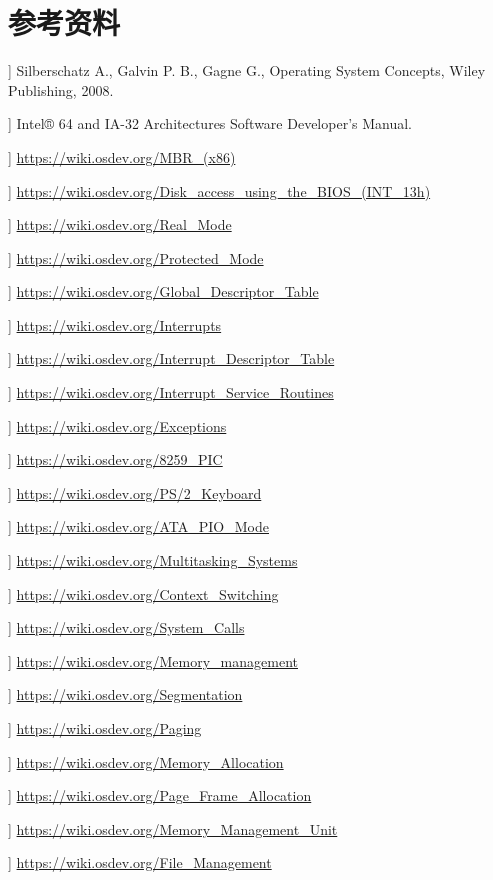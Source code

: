 \section*{参考资料}

\begin{list}{}{\setlength{\labelwidth}{0.5cm} \setlength{\labelsep}{0cm}}
    \item[\hfill[1]] Silberschatz A., Galvin P. B., Gagne G., Operating System Concepts, Wiley Publishing, 2008.
    \item[\hfill[2]] Intel® 64 and IA-32 Architectures Software Developer's Manual.
    \item[\hfill[3]] \url{https://wiki.osdev.org/MBR\_(x86)}
    \item[\hfill[4]] \url{https://wiki.osdev.org/Disk\_access\_using\_the\_BIOS\_(INT\_13h)}
    \item[\hfill[5]] \url{https://wiki.osdev.org/Real\_Mode}
    \item[\hfill[6]] \url{https://wiki.osdev.org/Protected\_Mode}
    \item[\hfill[7]] \url{https://wiki.osdev.org/Global\_Descriptor\_Table}
    \item[\hfill[8]] \url{https://wiki.osdev.org/Interrupts}
    \item[\hfill[9]] \url{https://wiki.osdev.org/Interrupt\_Descriptor\_Table}
    \item[\hfill[10]] \url{https://wiki.osdev.org/Interrupt\_Service\_Routines}
    \item[\hfill[11]] \url{https://wiki.osdev.org/Exceptions}
    \item[\hfill[12]] \url{https://wiki.osdev.org/8259\_PIC}
    \item[\hfill[13]] \url{https://wiki.osdev.org/PS/2\_Keyboard}
    \item[\hfill[14]] \url{https://wiki.osdev.org/ATA\_PIO\_Mode}
    \item[\hfill[15]] \url{https://wiki.osdev.org/Multitasking\_Systems}
    \item[\hfill[16]] \url{https://wiki.osdev.org/Context\_Switching}
    \item[\hfill[17]] \url{https://wiki.osdev.org/System\_Calls}
    \item[\hfill[18]] \url{https://wiki.osdev.org/Memory\_management}
    \item[\hfill[19]] \url{https://wiki.osdev.org/Segmentation}
    \item[\hfill[20]] \url{https://wiki.osdev.org/Paging}
    \item[\hfill[21]] \url{https://wiki.osdev.org/Memory\_Allocation}
    \item[\hfill[22]] \url{https://wiki.osdev.org/Page\_Frame\_Allocation}
    \item[\hfill[23]] \url{https://wiki.osdev.org/Memory\_Management\_Unit}
    \item[\hfill[24]] \url{https://wiki.osdev.org/File\_Management}
\end{list}